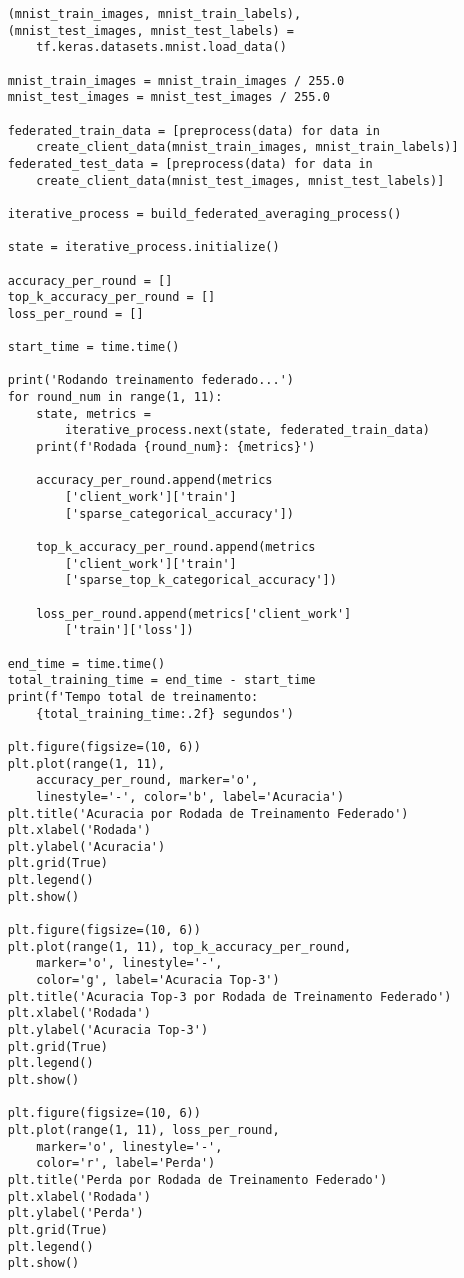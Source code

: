 \begin{lstlisting}
    (mnist_train_images, mnist_train_labels), 
    (mnist_test_images, mnist_test_labels) = 
        tf.keras.datasets.mnist.load_data()
    
    mnist_train_images = mnist_train_images / 255.0
    mnist_test_images = mnist_test_images / 255.0

    federated_train_data = [preprocess(data) for data in 
        create_client_data(mnist_train_images, mnist_train_labels)]
    federated_test_data = [preprocess(data) for data in 
        create_client_data(mnist_test_images, mnist_test_labels)]

    iterative_process = build_federated_averaging_process()

    state = iterative_process.initialize()

    accuracy_per_round = []
    top_k_accuracy_per_round = []
    loss_per_round = []

    start_time = time.time()

    print('Rodando treinamento federado...')
    for round_num in range(1, 11):
        state, metrics = 
            iterative_process.next(state, federated_train_data)
        print(f'Rodada {round_num}: {metrics}')

        accuracy_per_round.append(metrics
            ['client_work']['train']
            ['sparse_categorical_accuracy'])
        
        top_k_accuracy_per_round.append(metrics
            ['client_work']['train']
            ['sparse_top_k_categorical_accuracy'])
        
        loss_per_round.append(metrics['client_work']
            ['train']['loss'])

    end_time = time.time()
    total_training_time = end_time - start_time
    print(f'Tempo total de treinamento: 
        {total_training_time:.2f} segundos')

    plt.figure(figsize=(10, 6))
    plt.plot(range(1, 11), 
        accuracy_per_round, marker='o', 
        linestyle='-', color='b', label='Acuracia')
    plt.title('Acuracia por Rodada de Treinamento Federado')
    plt.xlabel('Rodada')
    plt.ylabel('Acuracia')
    plt.grid(True)
    plt.legend()
    plt.show()

    plt.figure(figsize=(10, 6))
    plt.plot(range(1, 11), top_k_accuracy_per_round, 
        marker='o', linestyle='-', 
        color='g', label='Acuracia Top-3')
    plt.title('Acuracia Top-3 por Rodada de Treinamento Federado')
    plt.xlabel('Rodada')
    plt.ylabel('Acuracia Top-3')
    plt.grid(True)
    plt.legend()
    plt.show()

    plt.figure(figsize=(10, 6))
    plt.plot(range(1, 11), loss_per_round, 
        marker='o', linestyle='-', 
        color='r', label='Perda')
    plt.title('Perda por Rodada de Treinamento Federado')
    plt.xlabel('Rodada')
    plt.ylabel('Perda')
    plt.grid(True)
    plt.legend()
    plt.show()
\end{lstlisting}

